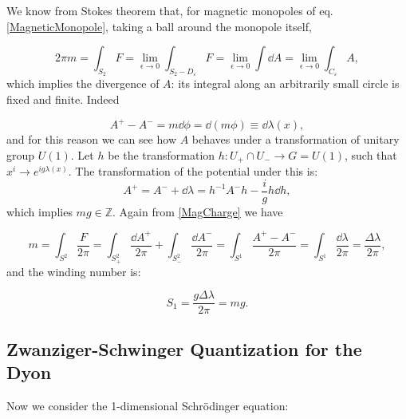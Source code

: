 \documentclass[main.tex]{subfiles}
\begin{document}
We know from Stokes theorem that, for magnetic monopoles of eq.\eqref{MagneticMonopole}, taking a ball around the monopole itself,

\begin{equation}\label{MagCharge}
2\pi m=\int_{S_2} F=\lim_{\epsilon\to 0}\int_{S_2-D_{\varepsilon}}F=\lim_{\epsilon\to 0}\int \dd{A}=\lim_{\epsilon\to 0}\int_{C_{\varepsilon}} A,
\end{equation}
which implies the divergence of $A$: its integral along an arbitrarily small circle is fixed and finite.
Indeed

\begin{equation}
A^+-A^-=m\dd{\phi}=\dd{(m\phi)} \equiv \dd{\lambda(x)},
\end{equation}
%
and for this reason we can see how $A$ behaves under a transformation of unitary group $U(1)$.
Let $h$ be the transformation $h:U_+\cap U_- \to G=U(1)$, such that $x^i\to e^{ig\lambda(x)}$.
The transformation of the potential under this is:
%
\begin{equation}
A^+=A^-+\dd{\lambda}=h^{-1}A^-h-\frac{i}{g}h \dd{h},
\end{equation}
%
which implies $mg\in \mathbb{Z}$. Again from \eqref{MagCharge} we have

\begin{equation}
m=\int_{S^2}\frac{F}{2\pi}=\int_{S^2_+}\frac{\dd{A}^+}{2\pi}+\int_{S^2_-}\frac{\dd{A}^-}{2\pi}=\int_{S^1}\frac{A^+-A^-}{2\pi}=\int_{S^1}\frac{\dd{\lambda}}{2\pi}=\frac{\Delta\lambda}{2\pi},
\end{equation}
and the winding number is:

\begin{equation}
S_1=\frac{g\Delta\lambda}{2\pi}=mg.
\end{equation}
\subsection{Zwanziger-Schwinger Quantization for the Dyon}

Now we consider the 1-dimensional Schrödinger equation:
\end{document}
